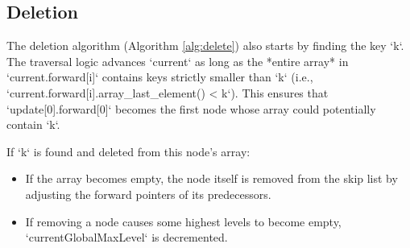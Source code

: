 \documentclass{article}
\begin{document}
\subsection{Deletion}
The deletion algorithm (Algorithm \ref{alg:delete}) also starts by finding the key `k`. The traversal logic advances `current` as long as the *entire array* in `current.forward[i]` contains keys strictly smaller than `k` (i.e., `current.forward[i].array_last_element() < k`). This ensures that `update[0].forward[0]` becomes the first node whose array could potentially contain `k`.

If `k` is found and deleted from this node's array:
\begin{itemize}
    \item If the array becomes empty, the node itself is removed from the skip list by adjusting the forward pointers of its predecessors.
    \item If removing a node causes some highest levels to become empty, `currentGlobalMaxLevel` is decremented.
\end{itemize}
\end{document}
